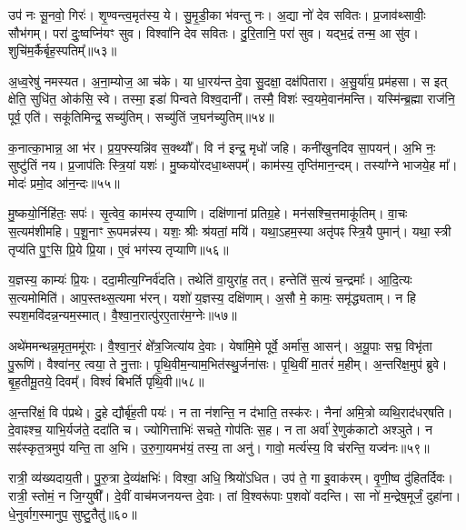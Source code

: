 उप॑ नः सू॒नवो॒ गिरः॑।
शृ॒ण्वन्त्व॒मृत॑स्य॒ ये।
सु॒मृ॒डी॒का भ॑वन्तु नः।
अ॒द्या नो॑ देव सवितः।
प्र॒जाव॑थ्सावीः॒ सौभ॑गम्।
परा॑ दुः॒ष्वप्नि॑यꣳ सुव।
विश्वा॑नि देव सवितः।
दु॒रि॒तानि॒ परा॑ सुव।
यद्भ॒द्रं तन्म॒ आ सु॑व।
शुचि॑म॒र्कैर्बृह॒स्पतिम्᳚॥५३॥\ip

अ॒ध्व॒रेषु॑ नमस्यत।
अ॒ना॒म्योज॒ आ च॑के।
या धा॒रय॑न्त दे॒वा सु॒दक्षा॒ दक्ष॑पितारा।
अ॒सु॒र्या॑य॒ प्रम॑हसा।
स इत् क्षेति॒ सुधि॑त॒ ओक॑सि॒ स्वे।
तस्मा॒ इडा॑ पिन्वते विश्व॒दानी᳚।
तस्मै॒ विशः॑ स्व॒यमे॒वान॑मन्ति।
यस्मि॑न्ब्र॒ह्मा राज॑नि॒ पूर्व॒ एति॑।
सकू॑तिमिन्द्र॒ सच्यु॑तिम्।
सच्यु॑तिं ज॒घन॑च्युतिम्॥५४॥\ip

क॒नात्का॒भान्न॒ आ भ॑र।
प्र॒य॒फ्स्यन्नि॑व स॒क्थ्यौ᳚।
वि न॑ इन्द्र॒ मृधो॑ जहि।
कनी॑खुनदिव सा॒पयन्॑।
अ॒भि नः॒ सुष्टु॑तिं नय।
प्र॒जा\-प॑तिः स्त्रि॒यां यशः॑।
मु॒ष्कयो॑रदधा॒थ्सपम्᳚।
काम॑स्य॒ तृप्ति॑मान॒न्दम्।
तस्या᳚ग्ने भाजये॒ह मा᳚।
मोदः॑ प्रमो॒द आ॑न॒न्दः॥५५॥\ip

मु॒ष्कयो॒र्निहि॑तः॒ सपः॑।
सृ॒त्वेव॒ काम॑स्य तृप्याणि।
दक्षि॑णानां प्रतिग्र॒हे।
मन॑सश्चि॒त्तमाकू॑तिम्।
वा॒चः स॒त्यम॑शीमहि।
प॒शू॒नाꣳ रू॒पमन्न॑स्य।
यशः॒ श्रीः श्र॑यतां॒ मयि॑।
यथा॒ऽहम॒स्या अतृ॑पꣴ स्त्रि॒यै पुमान्॑।
यथा॒ स्त्री तृप्य॑ति पु॒ꣳ॒सि प्रि॒ये प्रि॒या।
ए॒वं भग॑स्य तृप्याणि॥५६॥\ip

य॒ज्ञस्य॒ काम्यः॑ प्रि॒यः।
ददा॒मीत्य॒ग्निर्व॑दति।
तथेति॑ वा॒युरा॑ह॒ तत्।
हन्तेति॑ स॒त्यं च॒न्द्रमाः᳚।
आ॒दि॒त्यः स॒त्यमोमिति॑।
आप॒स्तथ्स॒त्यमा भ॑रन्।
यशो॑ य॒ज्ञस्य॒ दक्षि॑णाम्।
अ॒सौ मे॒ कामः॒ समृ॑द्ध्यताम्।
न हि स्पश॒मवि॑दन्न॒न्यम॒स्मात्।
वै॒श्वा॒न॒रात्पु॑रए॒तार॑म॒ग्नेः॥५७॥\ip

अथे॑ममन्थन्न॒मृत॒ममू॑राः।
वै॒श्वा॒न॒रं क्षे᳚त्र॒जित्या॑य दे॒वाः।
येषा॑मि॒मे पूर्वे॒ अर्मा॑स॒ आसन्॑।
अ॒यू॒पाः सद्म॒ विभृ॑ता पु॒रूणि॑।
वैश्वा॑नर॒ त्वया॒ ते नु॒त्ताः।
पृ॒थि॒वीम॒न्याम॒भित॑स्थु॒र्जना॑सः।
पृ॒थि॒वीं मा॒तरं॑ म॒हीम्।
अ॒न्तरि॑क्ष॒मुप॑ ब्रुवे।
बृ॒ह॒तीमू॒तये॒ दिवम्᳚।
विश्वं॑ बिभर्ति पृथि॒वी॥५८॥\ip

अ॒न्तरि॑क्षं॒ वि प॑प्रथे।
दु॒हे द्यौर्बृ॑ह॒ती पयः॑।
न ता न॑शन्ति॒ न द॑भाति॒ तस्क॑रः।
नैना॑ अमि॒त्रो व्यथि॒राद॑धर्‌\mbox{}षति।
दे॒वाꣴश्च॒ याभि॒र्यज॑ते॒ ददा॑ति च।
ज्योगित्ताभिः॑ सचते॒ गोप॑तिः स॒ह।
न ता अर्वा॑ रे॒णुक॑काटो अश्ञुते।
न सꣴ॑स्कृत॒त्रमुप॑ यन्ति॒ ता अ॒भि।
उ॒रु॒गा॒यमभ॑यं॒ तस्य॒ ता अनु॑।
गावो॒ मर्त्य॑स्य॒ वि च॑रन्ति॒ यज्व॑नः॥५९॥\ip

रात्री॒ व्य॑ख्यदाय॒ती।
पु॒रु॒त्रा दे॒व्य॑क्षभिः॑।
विश्वा॒ अधि॒ श्रियो॑ऽधित।
उप॑ ते॒ गा इ॒वाक॑रम्।
वृ॒णी॒ष्व दु॑हितर्दिवः।
रात्री॒ स्तोमं॒ न जि॒ग्युषी᳚।
दे॒वीं वाच॑मजनयन्त दे॒वाः।
तां वि॒श्वरू॑पाः प॒शवो॑ वदन्ति।
सा नो॑ म॒न्द्रेष॒मूर्जं॒ दुहा॑ना।
धे॒नुर्वाग॒स्मानुप॒ सुष्टु॒तैतु॑॥६०॥\ip

